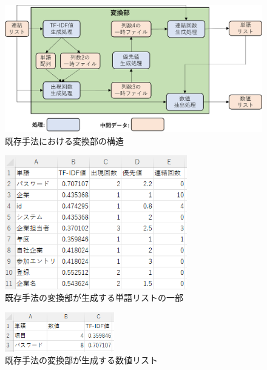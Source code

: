 \begin{figure}[tp]
    \begin{center}
        \includegraphics[width=1.0\columnwidth]{image/exis_transfer_structure.png}
        \caption{既存手法における変換部の構造}
        \label{fig:exis_transfer_structure}
    \end{center}
\end{figure}

\begin{figure}[tp]
    \begin{center}
        \includegraphics[width=300]{image/exis_word_list.png}
        \caption{既存手法の変換部が生成する単語リストの一部}
        \label{fig:exis_word_list}
    \end{center}
\end{figure}

\begin{figure}[tp]
    \begin{center}
        \includegraphics[width=180]{image/exis_suti_list.png}
        \caption{既存手法の変換部が生成する数値リスト}
        \label{fig:exis_suti_list}
    \end{center}
\end{figure}

